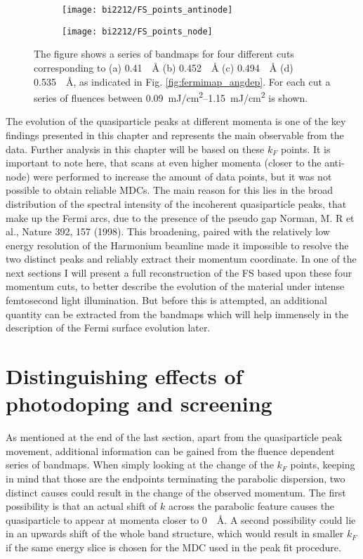 \begin{figure}[b!]
	\centering
	\begin{subfigure}[b]{0.49\textwidth}
		\texttt{[image: bi2212/FS\_points\_antinode]}
		\caption{}
	\end{subfigure}
	\hfill
	\begin{subfigure}[b]{0.49\textwidth}
		\texttt{[image: bi2212/FS\_points\_node]}
		\caption{}
	\end{subfigure}
	\caption{The figure shows a series of bandmaps for four different cuts corresponding to (a) \qty{0.41}{\per\angstrom} (b) \qty{0.452}{\per\angstrom} (c) \qty{0.494}{\per\angstrom} (d) \qty{0.535}{\per\angstrom}, as indicated in Fig. \ref{fig:fermimap_angdep}. For each cut a series of fluences between \qtyrange{0.09}{1.15}{\milli\joule/\centi\meter\squared} is shown.}
	\label{fig:FS_points_zoom}
\end{figure}

The evolution of the quasiparticle peaks at different momenta is one of the key findings presented in this chapter and represents the main observable from the data.
Further analysis in this chapter will be based on these $k_F$ points.
It is important to note here, that scans at even higher momenta (closer to the anti-node) were performed to increase the amount of data points, but it was not possible to obtain reliable MDCs.
The main reason for this lies in the broad distribution of the spectral intensity of the incoherent quasiparticle peaks, that make up the Fermi arcs, due to the presence of the pseudo gap \cite{bibid} Norman, M. R et al., Nature 392, 157 (1998).
This broadening, paired with the relatively low energy resolution of the Harmonium beamline made it impossible to resolve the two distinct peaks and reliably extract their momentum coordinate.
In one of the next sections I will present a full reconstruction of the FS based upon these four momentum cuts, to better describe the evolution of the material under intense femtosecond light illumination.
But before this is attempted, an additional quantity can be extracted from the bandmaps which will help immensely in the description of the Fermi surface evolution later.


\section{Distinguishing effects of photodoping and screening}
\label{sec:mu}

As mentioned at the end of the last section, apart from the quasiparticle peak movement, additional information can be gained from the fluence dependent series of bandmaps.
When simply looking at the change of the $k_F$ points, keeping in mind that those are the endpoints terminating the parabolic dispersion, two distinct causes could result in the change of the observed momentum.
The first possibility is that an actual shift of $k$ across the parabolic feature causes the quasiparticle to appear at momenta closer to \qty{0}{\per\angstrom}.
A second possibility could lie in an upwards shift of the whole band structure, which would result in smaller $k_F$ if the same energy slice is chosen for the MDC used in the peak fit procedure.

